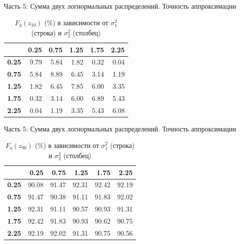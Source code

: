 \documentclass[ucs, notheorems, handout]{beamer}
\begin{document}
	\begin{frame}{Часть 5: Сумма двух логнормальных распределений. Точность аппроксимации}
		
		\begin{table}[!hhh]
			\centering
			\caption{$F_{\eta}(z_{10})$ ($\%$) в зависимости от $\sigma_{1}^{2}$ (строка) и $\sigma_{2}^{2}$ (столбец) }
			\label{tab5}
			\begin{tabular}{rrrrrr}
				\hline
				& \textbf{0.25} & \textbf{0.75} & \textbf{1.25} & \textbf{1.75} & \textbf{2.25} \\ 
				\hline
				\textbf{0.25} & 9.79 & 5.84 & 1.82 & 0.32 & 0.04 \\ 
				\textbf{0.75} & 5.84 & 8.89 & 6.45 & 3.14 & 1.19 \\ 
				\textbf{1.25} & 1.82 & 6.45 & 7.85 & 6.00 & 3.35 \\ 
				\textbf{1.75} & 0.32 & 3.14 & 6.00 & 6.89 & 5.43 \\ 
				\textbf{2.25} & 0.04 & 1.19 & 3.35 & 5.43 & 6.08 \\ 
				\hline
			\end{tabular}
		\end{table}
	
	\end{frame}

	\begin{frame}{Часть 5: Сумма двух логнормальных распределений. Точность аппроксимации}
	
	\begin{table}[!hhh]
		\centering
		\caption{$F_{\eta}(z_{90})$ ($\%$) в зависимости от $\sigma_{1}^{2}$ (строка) и $\sigma_{2}^{2}$ (столбец)}
		\label{tab6}
		\begin{tabular}{rrrrrr}
			\hline
			& \textbf{0.25} & \textbf{0.75} & \textbf{1.25} & \textbf{1.75} & \textbf{2.25} \\
			\hline
			\textbf{0.25} & 90.08 & 91.47 & 92.31 & 92.42 & 92.19 \\ 
			\textbf{0.75} & 91.47 & 90.38 & 91.11 & 91.83 & 92.02 \\ 
			\textbf{1.25} & 92.31 & 91.11 & 90.57 & 90.93 & 91.31 \\ 
			\textbf{1.75} & 92.42 & 91.83 & 90.93 & 90.62 & 90.75 \\ 
			\textbf{2.25} & 92.19 & 92.02 & 91.31 & 90.75 & 90.56 \\ 
			\hline
		\end{tabular}
	\end{table}
	
\end{frame}
	
\end{document}
